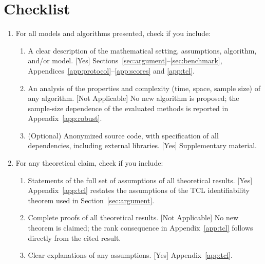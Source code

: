 \section*{Checklist}

\begin{enumerate}

  \item For all models and algorithms presented, check if you include:
  \begin{enumerate}
    \item A clear description of the mathematical setting, assumptions, algorithm, and/or model. [Yes] Sections~\ref{sec:argument}--\ref{sec:benchmark}, Appendices~\ref{app:protocol}--\ref{app:scores} and \ref{app:tcl}.
    \item An analysis of the properties and complexity (time, space, sample size) of any algorithm. [Not Applicable] No new algorithm is proposed; the sample-size dependence of the evaluated methods is reported in Appendix~\ref{app:robust}.
    \item (Optional) Anonymized source code, with specification of all dependencies, including external libraries. [Yes] Supplementary material.
  \end{enumerate}

  \item For any theoretical claim, check if you include:
  \begin{enumerate}
    \item Statements of the full set of assumptions of all theoretical results. [Yes] Appendix~\ref{app:tcl} restates the assumptions of the TCL identifiability theorem used in Section~\ref{sec:argument}.
    \item Complete proofs of all theoretical results. [Not Applicable] No new theorem is claimed; the rank consequence in Appendix~\ref{app:tcl} follows directly from the cited result.
    \item Clear explanations of any assumptions. [Yes] Appendix~\ref{app:tcl}.
  \end{enumerate}


\end{enumerate}
